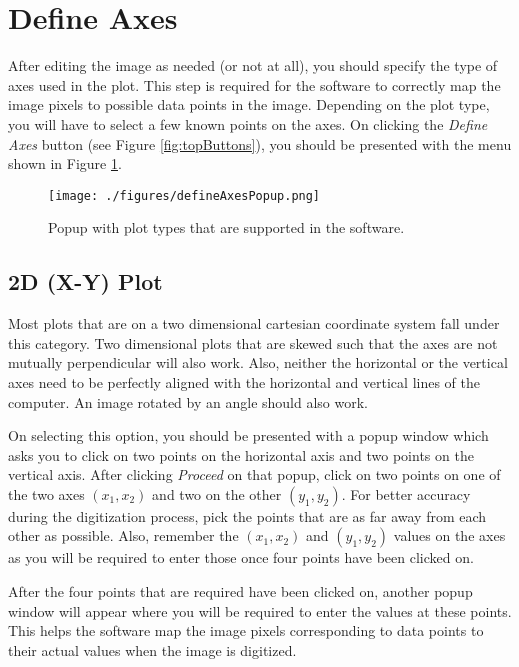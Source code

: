 \documentclass[letterpaper, 10pt]{article}
\begin{document}
\section{Define Axes}

After editing the image as needed (or not at all),  you should specify the type of axes used in the plot. This step is required for the software to correctly map the image pixels to possible data points in the image. Depending on the plot type, you will have to select a few known points on the axes. On clicking the \emph{Define Axes} button (see Figure \ref{fig:topButtons}), you should be presented with the menu shown in Figure \ref{fig:defineAxesPopup}.
\begin{figure}
\begin{center}
\texttt{[image: ./figures/defineAxesPopup.png]}
\caption{Popup with plot types that are supported in the software.}
\label{fig:defineAxesPopup}
\end{center}
\end{figure}

\subsection{2D (X-Y) Plot}
Most plots that are on a two dimensional cartesian coordinate system fall under this category. Two dimensional plots that are skewed such that the axes are not mutually perpendicular will also work. Also, neither the horizontal or the vertical axes need to be perfectly aligned with the horizontal and vertical lines of the computer. An image rotated by an angle should also work. 

On selecting this option, you should be presented with a popup window which asks you to click on two points on the horizontal axis and two points on the vertical axis. After clicking \emph{Proceed} on that popup, click on two points on one of the two axes $(x_1, x_2)$ and two on the other $(y_1, y_2)$. For better accuracy during the digitization process, pick the points that are as far away from each other as possible. Also, remember the $(x_1, x_2)$ and $(y_1, y_2)$ values on the axes as you will be required to enter those once four points have been clicked on.

After the four points that are required have been clicked on, another popup window will appear where you will be required to enter the values at these points. This helps the software map the image pixels corresponding to data points to their actual values when the image is digitized.
\end{document}
